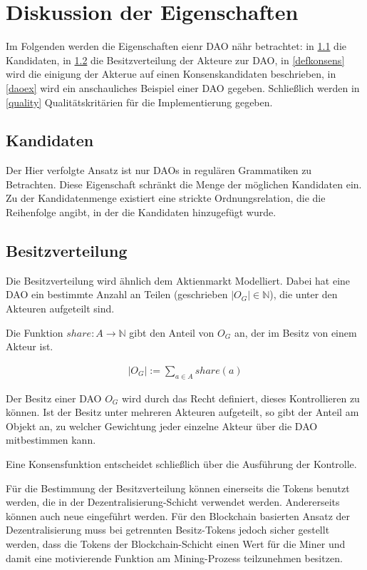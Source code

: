 \documentclass[a4paper,12pt]{report}
\begin{document}
\section{Diskussion der Eigenschaften}
\label{smoddiskuss}

Im Folgenden werden die Eigenschaften eienr DAO nähr betrachtet: in \ref{kand} die Kandidaten, in \ref{besitz} die Besitzverteilung der Akteure zur DAO, in \ref{defkonsens} wird die einigung der Akterue auf einen Konsenskandidaten beschrieben, in \ref{daoex} wird ein anschauliches Beispiel einer DAO gegeben. Schließlich werden in \ref{quality} Qualitätskritärien für die Implementierung gegeben.

\subsection{Kandidaten}
\label{kand}
Der Hier verfolgte Ansatz ist nur DAOs in regulären Grammatiken zu Betrachten. Diese Eigenschaft schränkt die Menge der möglichen Kandidaten ein. Zu der Kandidatenmenge existiert eine strickte Ordnungsrelation, die die Reihenfolge angibt, in der die Kandidaten hinzugefügt wurde.

\subsection{Besitzverteilung}
\label{besitz}


Die Besitzverteilung wird ähnlich dem Aktienmarkt Modelliert. Dabei hat eine DAO ein bestimmte Anzahl an Teilen (geschrieben $|O_G| \in \mathbb{N}$), die unter den Akteuren aufgeteilt sind. 

Die Funktion $share: A \rightarrow \mathbb{N}$ gibt den Anteil von $O_G$ an, der im Besitz von einem Akteur ist. 

\begin{eqnarray}
  |O_G| := \sum_{a \in A} share(a)
\end{eqnarray}

Der Besitz einer DAO $O_G$ wird durch das Recht definiert, dieses Kontrollieren zu können\cite{Waldron2004}. Ist der Besitz unter mehreren Akteuren aufgeteilt, so gibt der Anteil am Objekt an, zu welcher Gewichtung jeder einzelne Akteur über die DAO mitbestimmen kann.

Eine Konsensfunktion entscheidet schließlich über die Ausführung der Kontrolle.

Für die Bestimmung der Besitzverteilung können einerseits die Tokens benutzt werden, die in der Dezentralisierung-Schicht verwendet werden. Andererseits können auch neue eingeführt werden. Für den Blockchain basierten Ansatz der Dezentralisierung muss bei getrennten Besitz-Tokens jedoch sicher gestellt werden, dass die Tokens der Blockchain-Schicht einen Wert für die Miner und damit eine motivierende Funktion am Mining-Prozess teilzunehmen besitzen. 
\end{document}
